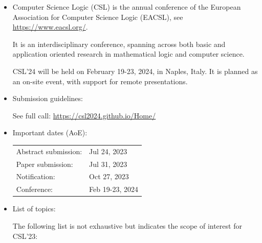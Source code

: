 \documentclass[prodmode,acmtecs]{acmsmall} %
\begin{document}
\begin{itemize}\item   Computer Science Logic (CSL) is the annual conference of the European Association for Computer Science Logic (EACSL), see \href{https://www.eacsl.org/}{https://www.eacsl.org/}.  
 
  It is an interdisciplinary conference, spanning across both basic and application oriented research in mathematical logic and computer science.   
 
  CSL'24 will be held on February 19-23, 2024, in Naples, Italy. It is planned as an on-site event, with support for remote presentations. 
 
\item  Submission guidelines: 
 
 See full call: \href{https://csl2024.github.io/Home/}{https://csl2024.github.io/Home/} 
 
\item  Important dates (AoE): 
 
\begin{tabulary}{\linewidth}{LL}Abstract submission:  & Jul 24, 2023 \\
Paper submission:  & Jul 31, 2023 \\
Notification:  & Oct 27, 2023 \\
Conference:  & Feb 19-23, 2024 \\
\end{tabulary}
 
\item List of topics: 
 
 The following list is not exhaustive but indicates the scope of interest for CSL'23: 
 

\end{itemize}
\end{document}
